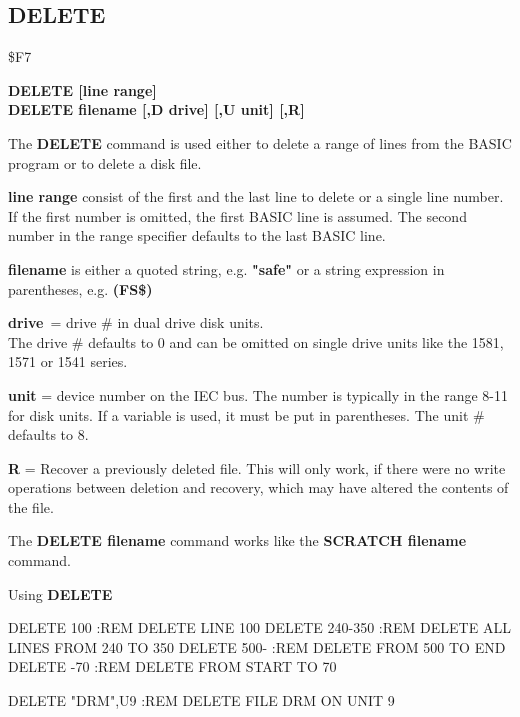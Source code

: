 \subsection{DELETE}
\begin{description}[leftmargin=3cm,style=nextline]
\item [Token:] \$F7
\item [Format:] {\bf DELETE [line range]} \\
                {\bf DELETE filename [,D drive] [,U unit] [,R]}
\item [Usage:] The {\bf DELETE} command is used either to delete
               a range of lines from the BASIC program or
               to delete a disk file.

               {\bf line range} consist of the first and the last
               line to delete or a single line number.
               If the first number is omitted, the
               first BASIC line is assumed.
               The second number in the range specifier defaults
               to the last BASIC line.

   {\bf filename} is either a quoted string, e.g. {\bf "safe"} or
   a string expression in parentheses, e.g. {\bf (FS\$)}

   {\bf drive} = drive \# in dual drive disk units. \\
   The drive \# defaults to 0 and can be omitted on single drive units
   like the 1581, 1571 or 1541 series.

   {\bf unit} = device number on the IEC bus.
   The number is typically in the range 8-11 for disk units.
   If a variable is used, it must be put in parentheses.
   The unit \# defaults to 8.

   {\bf R} = Recover a previously deleted file.
   This will only work, if there were no write operations
   between deletion and recovery, which may have altered the
   contents of the file.

\item [Remarks:] The {\bf DELETE filename} command works like the
                 {\bf SCRATCH filename} command.

\item [Example:] Using {\bf DELETE}
\begin{screenoutput}
  DELETE 100      :REM DELETE LINE 100
  DELETE 240-350  :REM DELETE ALL LINES FROM 240 TO 350
  DELETE 500-     :REM DELETE FROM 500 TO END
  DELETE -70      :REM DELETE FROM START TO 70

  DELETE "DRM",U9 :REM DELETE FILE DRM ON UNIT 9
\end{screenoutput}
\end{description}

